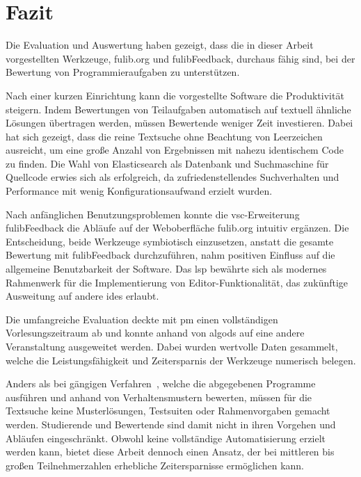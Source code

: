 \chapter{Fazit}\label{ch:conclusion}

Die Evaluation und Auswertung haben gezeigt, dass die in dieser Arbeit vorgestellten Werkzeuge, fulib.org und fulibFeedback, durchaus fähig sind, bei der Bewertung von Programmieraufgaben zu unterstützen.

Nach einer kurzen Einrichtung kann die vorgestellte Software die Produktivität steigern.
Indem Bewertungen von Teilaufgaben automatisch auf textuell ähnliche Lösungen übertragen werden, müssen Bewertende weniger Zeit investieren.
Dabei hat sich gezeigt, dass die reine Textsuche ohne Beachtung von Leerzeichen ausreicht, um eine große Anzahl von Ergebnissen mit nahezu identischem Code zu finden.
Die Wahl von Elasticsearch als Datenbank und Suchmaschine für Quellcode erwies sich als erfolgreich, da zufriedenstellendes Suchverhalten und Performance mit wenig Konfigurationsaufwand erzielt wurden.

Nach anfänglichen Benutzungsproblemen konnte die \ac{vsc}-Erweiterung fulibFeedback die Abläufe auf der Weboberfläche fulib.org intuitiv ergänzen.
Die Entscheidung, beide Werkzeuge symbiotisch einzusetzen, anstatt die gesamte Bewertung mit fulibFeedback durchzuführen, nahm positiven Einfluss auf die allgemeine Benutzbarkeit der Software.
Das \acl{lsp} bewährte sich als modernes Rahmenwerk für die Implementierung von Editor-Funktionalität, das zukünftige Ausweitung auf andere \acp{ide} erlaubt.

Die umfangreiche Evaluation deckte mit \ac{pm} einen vollständigen Vorlesungszeitraum ab und konnte anhand von \acl{algods} auf eine andere Veranstaltung ausgeweitet werden.
Dabei wurden wertvolle Daten gesammelt, welche die Leistungsfähigkeit und Zeitersparnis der Werkzeuge numerisch belegen.

Anders als bei gängigen Verfahren~\cite{jackson-1997-assyst,edwards-2008-web-cat,enstroem-et-al-2011,vander-zanden-2012}, welche die abgegebenen Programme ausführen und anhand von Verhaltensmustern bewerten, müssen für die Textsuche keine Musterlösungen, Testsuiten oder Rahmenvorgaben gemacht werden.
Studierende und Bewertende sind damit nicht in ihren Vorgehen und Abläufen eingeschränkt.
Obwohl keine vollständige Automatisierung erzielt werden kann, bietet diese Arbeit dennoch einen Ansatz, der bei mittleren bis großen Teilnehmerzahlen erhebliche Zeitersparnisse ermöglichen kann.
